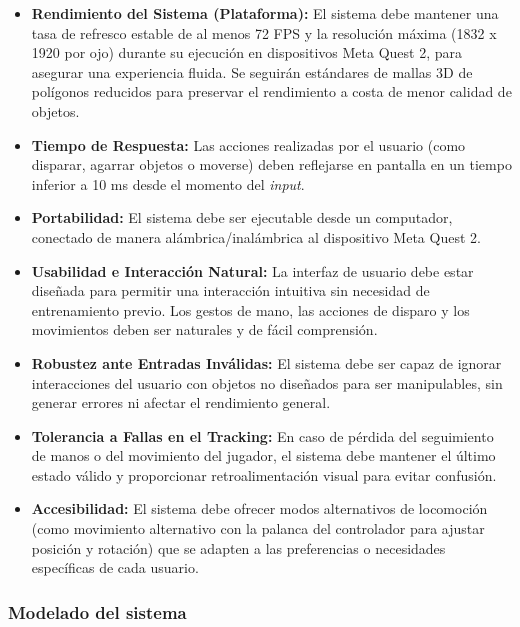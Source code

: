 \documentclass[journal,article,accept,pdftex,moreauthors]{Definitions/mdpi}
\begin{document}
\begin{itemize}
  \item \textbf{Rendimiento del Sistema (Plataforma):} El sistema debe mantener una tasa de refresco estable de al menos 72 FPS y la resolución máxima (1832 x 1920 por ojo) durante su ejecución en dispositivos Meta Quest 2, para asegurar una experiencia fluida. Se seguirán estándares de mallas 3D de polígonos reducidos para preservar el rendimiento a costa de menor calidad de objetos.

  \item \textbf{Tiempo de Respuesta:} Las acciones realizadas por el usuario (como disparar, agarrar objetos o moverse) deben reflejarse en pantalla en un tiempo inferior a 10 ms desde el momento del \textit{input}.

  \item \textbf{Portabilidad:} El sistema debe ser ejecutable desde un computador, conectado de manera alámbrica/inalámbrica al dispositivo Meta Quest 2.

  \item \textbf{Usabilidad e Interacción Natural:} La interfaz de usuario debe estar diseñada para permitir una interacción intuitiva sin necesidad de entrenamiento previo. Los gestos de mano, las acciones de disparo y los movimientos deben ser naturales y de fácil comprensión.

  \item \textbf{Robustez ante Entradas Inválidas:} El sistema debe ser capaz de ignorar interacciones del usuario con objetos no diseñados para ser manipulables, sin generar errores ni afectar el rendimiento general.

  \item \textbf{Tolerancia a Fallas en el Tracking:} En caso de pérdida del seguimiento de manos o del movimiento del jugador, el sistema debe mantener el último estado válido y proporcionar retroalimentación visual para evitar confusión.

  \item \textbf{Accesibilidad:} El sistema debe ofrecer modos alternativos de locomoción (como movimiento alternativo con la palanca del controlador para ajustar posición y rotación) que se adapten a las preferencias o necesidades específicas de cada usuario.
\end{itemize}



\subsubsection{Modelado del sistema}
\end{document}
